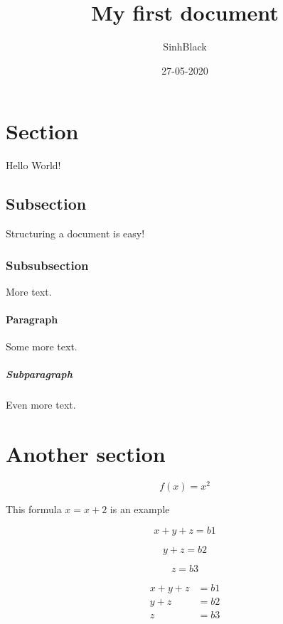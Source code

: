 \documentclass{article}
\title{My first document}
\date{27-05-2020}
\author{SinhBlack}
\begin{document}
    \tableofcontents

    \maketitle
    \newpage

    \section{Section}
    Hello World!

    \subsection{Subsection}
    Structuring a document is easy!

    \subsubsection{Subsubsection}
    More text.

    \paragraph{Paragraph}
    Some more text.

    \subparagraph{Subparagraph}
    Even more text.

    \section{Another section}

    \begin{equation*}
        f(x) = x^2
    \end{equation*}

    This formula $x = x + 2$ is an example

    \begin{equation*}
        x + y + z = b1
    \end{equation*}

    \begin{equation*}
        y + z = b2
    \end{equation*}

    \begin{equation*}
        z = b3
    \end{equation*}

    \begin{align*}
        x + y + z &= b1\\
            y + z &= b2\\
                z &= b3
    \end{align*}
\end{document}
